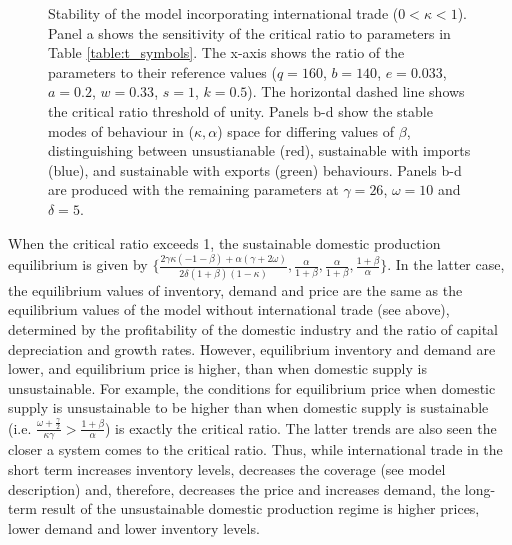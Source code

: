 \documentclass[9pt,twocolumn,twoside,lineno]{pnas-new}
\begin{document}
\begin{figure}[t!]
  \caption{Stability of the model incorporating international trade ($0 < \kappa < 1$). Panel a shows the sensitivity of the critical ratio to parameters in Table \ref{table:t_symbols}. The x-axis shows the ratio of the parameters to their reference values ($q = 160$, $b = 140$, $e = 0.033$, $a = 0.2$, $w = 0.33$, $s=1$, $k=0.5$). The horizontal dashed line shows the critical ratio threshold of unity. Panels b-d show the stable modes of behaviour in ($\kappa, \alpha$) space for differing values of $\beta$, distinguishing between unsustianable (red), sustainable with imports (blue), and sustainable with exports (green) behaviours. Panels b-d are produced with the remaining parameters at $\gamma = 26$, $\omega = 10$ and $\delta = 5$.}
  \label{figure2}
\end{figure}

When the critical ratio exceeds 1, the sustainable domestic production equilibrium is given by $\{\frac{2 \gamma \kappa (- 1 - \beta) + \alpha (\gamma + 2 \omega)}{2 \delta (1+\beta)(1 - \kappa) }, \frac{\alpha}{1 + \beta}, \frac{\alpha}{1 + \beta}, \frac{1 + \beta}{\alpha}\}$. In the latter case, the equilibrium values of inventory, demand and price are the same as the equilibrium values of the model without international trade (see above), determined by the profitability of the domestic industry and the ratio of capital depreciation and growth rates. However, equilibrium inventory and demand are lower, and equilibrium price is higher, than when domestic supply is unsustainable. For example, the conditions for equilibrium price when domestic supply is unsustainable to be higher than when domestic supply is sustainable (i.e. $\frac{\omega + \frac{\gamma}{2}}{\kappa \gamma} > \frac{1 + \beta}{\alpha}$) is exactly the critical ratio. The latter trends are also seen the closer a system comes to the critical ratio. Thus, while international trade in the short term increases inventory levels, decreases the coverage (see model description) and, therefore, decreases the price and increases demand, the long-term result of the unsustainable domestic production regime is higher prices, lower demand and lower inventory levels.
\end{document}
